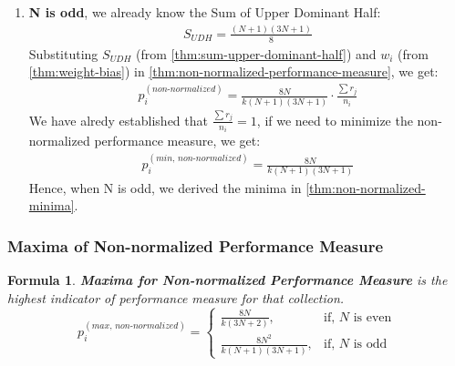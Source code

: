 \documentclass[a4paper,fleqn,review]{cas-sc}
\newtheorem{theorem}{Formula}
\begin{document}
\begin{enumerate}
	\item \textbf{N is odd}, we already know the Sum of Upper Dominant Half: 
	\begin{align*}
		S_{UDH} = \frac{(N+1)(3N+1)}{8}
	\end{align*}
	Substituting $S_{UDH}$ (from \autoref{thm:sum-upper-dominant-half}) and $w_i$ (from \autoref{thm:weight-bias}) in \autoref{thm:non-normalized-performance-measure}, 
	we get:
	\begin{align*}
		p_i^{(non\text{-}normalized)} = \frac{8N}{k(N+1)(3N+1)} \cdot \frac{\sum r_j}{n_i}
	\end{align*}
	We have alredy established that $\frac{\sum r_j}{n_i} = 1$,
	if we need to minimize the non-normalized performance measure,  we get:
	\begin{align*}
		p_i^{(min, \, non\text{-}normalized)} = \frac{8N}{k (N+1)(3N+1)}
	\end{align*}
	Hence, when N is odd, we derived the minima in \autoref{thm:non-normalized-minima}.
\end{enumerate}

\subsubsection{Maxima of Non-normalized Performance Measure}
\begin{theorem}\label{thm:non-normalized-maxima}
	\textbf{Maxima for Non-normalized Performance Measure} is the highest indicator of performance measure for that collection.
	\begin{equation}
		p_i^{(max, \, non\text{-}normalized)} =
		\begin{cases}
			\frac{8N}{k(3N + 2)}, & \text{if, } N \text{ is even} \\
			\frac{8N^2}{k (N+1)(3N+1)}, & \text{if, } N \text{ is odd}
		\end{cases}
	\end{equation}
\end{theorem}
\end{document}
